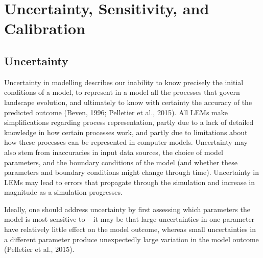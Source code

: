 %
%

\section{Uncertainty, Sensitivity, and Calibration}

\subsection{Uncertainty}
Uncertainty in modelling describes our inability to know precisely the initial conditions of a model, to represent in a model all the processes that govern landscape evolution, and ultimately to know with certainty the accuracy of the predicted outcome (Beven, 1996; Pelletier et al., 2015). All LEMs make simplifications regarding process representation, partly due to a lack of detailed knowledge in how certain processes work, and partly due to limitations about how these processes can be represented in computer models.  Uncertainty may also stem from inaccuracies in input data sources, the choice of model parameters, and the boundary conditions of the model (and whether these parameters and boundary conditions might change through time). Uncertainty in LEMs may lead to errors that propagate through the simulation and increase in magnitude as a simulation progresses. 

Ideally, one should address uncertainty by first assessing which parameters the model is most sensitive to – it may be that large uncertainties in one parameter have relatively little effect on the model outcome, whereas small uncertainties in a different parameter produce unexpectedly large variation in the model outcome (Pelletier et al., 2015).

